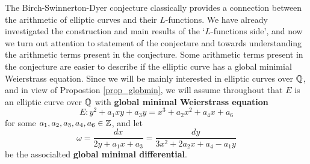 The Birch-Swinnerton-Dyer conjecture classically provides a connection between the arithmetic of elliptic curves and their $L$-functions. We have already investigated the construction and main results of the `$L$-functions side', and now we turn out attention to statement of the conjecture and towards understanding the arithmetic terms present in the conjecture. Some arithmetic terms present in the conjecture are easier to describe if the elliptic curve has a global minimial Weierstrass equation. Since we will be mainly interested in elliptic curves over $\mathbb{Q}$, and in view of Propostion \ref*{prop_globmin}, we will assume throughout that $E$ is an elliptic curve over $\mathbb{Q}$ with \textbf{global minimal Weierstrass equation}
$$E:y^2+a_1xy+a_3y=x^3+a_2x^2+a_4x+a_6$$ 
for some $a_1,a_2,a_3,a_4,a_6\in\mathbb{Z}$, and let 
$$\omega=\frac{dx}{2y+a_1x+a_3}=\frac{dy}{3x^2+2a_2x+a_4-a_1y}$$
be the associalted \textbf{global minimal differential}.





